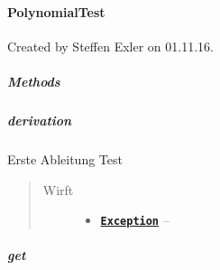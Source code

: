 \documentclass[letterpaper,10pt,ngerman]{sphinxmanual}
\begin{document}
\paragraph{PolynomialTest}
\label{com/linuxluigi/polynomial/test/PolynomialTest:polynomialtest}\label{com/linuxluigi/polynomial/test/PolynomialTest::doc}

\begin{fulllineitems}
\label{com/linuxluigi/polynomial/test/PolynomialTest:com.linuxluigi.polynomial.test.PolynomialTest}
Created by Steffen Exler on 01.11.16.

\end{fulllineitems}



\subparagraph{Methods}
\label{com/linuxluigi/polynomial/test/PolynomialTest:methods}

\subparagraph{derivation}
\label{com/linuxluigi/polynomial/test/PolynomialTest:derivation}

\begin{fulllineitems}
\label{com/linuxluigi/polynomial/test/PolynomialTest:com.linuxluigi.polynomial.test.PolynomialTest.derivation()}
Erste Ableitung Test
\begin{quote}\begin{description}
\item[{Wirft}] \leavevmode\begin{itemize}
\item {} 
\href{http://docs.oracle.com/javase/8/docs/api/java/lang/Exception.html}{\textbf{\texttt{Exception}}} -- 

\end{itemize}

\end{description}\end{quote}

\end{fulllineitems}



\subparagraph{get}
\label{com/linuxluigi/polynomial/test/PolynomialTest:get}
\end{document}
